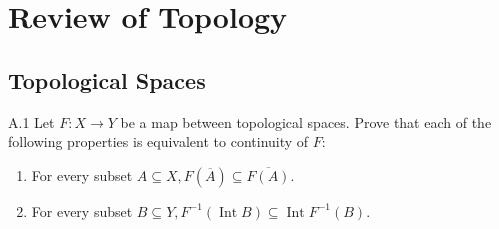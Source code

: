 \chapter{Review of Topology}

\section{Topological Spaces}

\begin{exercise}{A.1}
    Let \( F: X \to Y \) be a map between topological spaces. Prove that each of the following properties is equivalent to continuity of \( F \):
    \begin{enumerate}[itemsep=0pt,label={(\alph*)}]
        \item For every subset \( A \subseteq X, F(\overline{A}) \subseteq \overline{F(A)} \).
        \item For every subset \( B \subseteq Y, F^{-1}(\operatorname{Int} B) \subseteq \operatorname{Int} F^{-1}(B) \).
    \end{enumerate}
\end{exercise}

